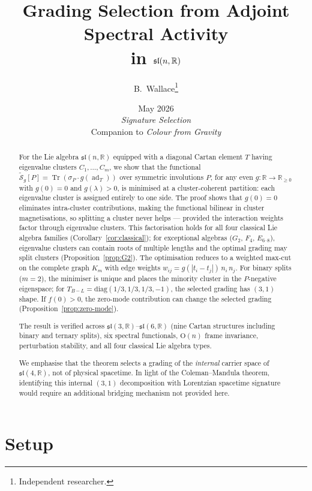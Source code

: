 \documentclass[11pt]{article}
\title{Grading Selection from Adjoint Spectral Activity\\
in $\sln{n}$}
\author{B.~Wallace\thanks{Independent researcher.}}
\date{May 2026 \\ \textit{Signature Selection} \\
Companion to \textit{Colour from Gravity}}
\theoremstyle{plain}
\theoremstyle{definition}
\theoremstyle{remark}
\newcommand{\sln}[1]{\mathfrak{sl}(#1,\mathbb{R})}
\newcommand{\TBL}{T_{B\!-\!L}}
\newcommand{\ad}{\operatorname{ad}}
\newcommand{\Tr}{\operatorname{Tr}}
\begin{document}
\maketitle

\begin{abstract}
For the Lie algebra $\sln{n}$ equipped with a diagonal Cartan
element $T$ having eigenvalue clusters $C_1, \ldots, C_m$, we show
that the functional
$\widetilde{\mathcal{S}}_g[P] = \Tr(\sigma_P \cdot g(\ad_T))$
over symmetric involutions $P$, for any even
$g : \mathbb{R} \to \mathbb{R}_{\ge 0}$ with $g(0) = 0$ and
$g(\lambda) > 0$, is minimised at a cluster-coherent partition:
each eigenvalue cluster is assigned entirely to one side.  The
proof shows that $g(0) = 0$ eliminates intra-cluster contributions,
making the functional bilinear in cluster magnetisations, so
splitting a cluster never helps --- provided the interaction weights
factor through eigenvalue clusters.  This factorisation holds for
all four classical Lie algebra families
(Corollary~\ref{cor:classical}); for exceptional algebras
($G_2$, $F_4$, $E_{6\text{--}8}$), eigenvalue clusters can contain
roots of multiple lengths and the optimal grading may split clusters
(Proposition~\ref{prop:G2}).  The optimisation reduces to a
weighted max-cut on the complete graph $K_m$ with edge weights
$w_{ij} = g(|t_i - t_j|)\,n_i\,n_j$.  For binary splits ($m = 2$),
the minimiser is unique and places the minority cluster in the
$P$-negative eigenspace; for $\TBL = \mathrm{diag}(1/3,1/3,1/3,-1)$,
the selected grading has $(3,1)$ shape.  If $f(0) > 0$, the
zero-mode contribution can change the selected grading
(Proposition~\ref{prop:zero-mode}).

The result is verified across $\sln{3}$--$\sln{6}$ (nine Cartan
structures including binary and ternary splits), six spectral
functionals, $\mathrm{O}(n)$ frame invariance, perturbation
stability, and all four classical Lie algebra types.

We emphasise that the theorem selects a grading of the
\emph{internal} carrier space of $\sln{4}$, not of physical
spacetime.  In light of the Coleman--Mandula theorem, identifying
this internal $(3,1)$ decomposition with Lorentzian spacetime
signature would require an additional bridging mechanism not
provided here.
\end{abstract}

\section{Setup}
\end{document}

